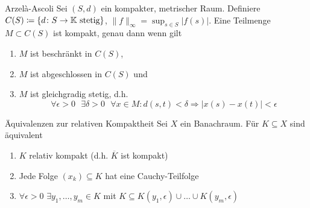 	\begin{karte}{Arzelà-Ascoli}
	Sei $(S, d)$ ein kompakter, metrischer Raum. Definiere $C(S) \coloneqq \{ d \colon S \rightarrow \mathbb{K} \text{ stetig} \}$, $\| f \|_{\infty} = \sup_{s \in S} | f(s) |$. Eine Teilmenge $M \subset C(S)$ ist kompakt, genau dann wenn gilt
		\begin{enumerate}[label=\alph*\upshape)]
			\item $M$ ist beschränkt in $C(S)$,
			\item $M$ ist abgeschlossen in $C(S)$ und
			\item $M$ ist gleichgradig stetig, d.h.
				\[ \forall \epsilon > 0 \text{ } \exists \delta > 0 \text{ } \forall x \in M: d(s, t) < \delta \Rightarrow | x(s) - x(t) | < \epsilon \]
		\end{enumerate}
	\end{karte}

	\begin{karte}{Äquivalenzen zur relativen Kompaktheit}	
		Sei $X$ ein Banachraum. Für $K \subseteq X$ sind äquivalent
		\begin{enumerate}[label=\alph*\upshape)]
			\item $K$ relativ kompakt (d.h. $\overline{K}$ ist kompakt)
			\item Jede Folge $(x_{k}) \subseteq K$ hat eine Cauchy-Teilfolge
			\item $\forall \epsilon > 0$ $\exists y_{1}, \dotsc, y_{m} \in K$ mit $K \subseteq K(y_{1}, \epsilon) \cup \dotsc \cup K(y_{m}, \epsilon)$
		\end{enumerate}
	\end{karte}